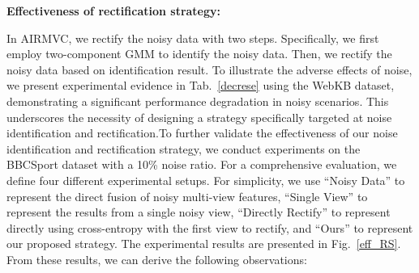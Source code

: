 \documentclass{article}
\theoremstyle{plain}
\theoremstyle{definition}
\theoremstyle{remark}
\begin{document}







\textbf{Effectiveness of rectification strategy:}

In AIRMVC, we rectify the noisy data with two steps. Specifically, we first employ two-component GMM to identify the noisy data. Then, we rectify the noisy data based on identification result. To illustrate the adverse effects of noise, we present experimental evidence in Tab.~\ref{decrese} using the WebKB dataset, demonstrating a significant performance degradation in noisy scenarios. This underscores the necessity of designing a strategy specifically targeted at noise identification and rectification.To further validate the effectiveness of our noise identification and rectification strategy, we conduct experiments on the BBCSport dataset with a 10\% noise ratio. For a comprehensive evaluation, we define four different experimental setups. For simplicity, we use ``Noisy Data'' to represent the direct fusion of noisy multi-view features, ``Single View'' to represent the results from a single noisy view, ``Directly Rectify'' to represent directly using cross-entropy with the first view to rectify, and ``Ours'' to represent our proposed strategy. The experimental results are presented in Fig.~\ref{eff_RS}. From these results, we can derive the following observations:
\end{document}
